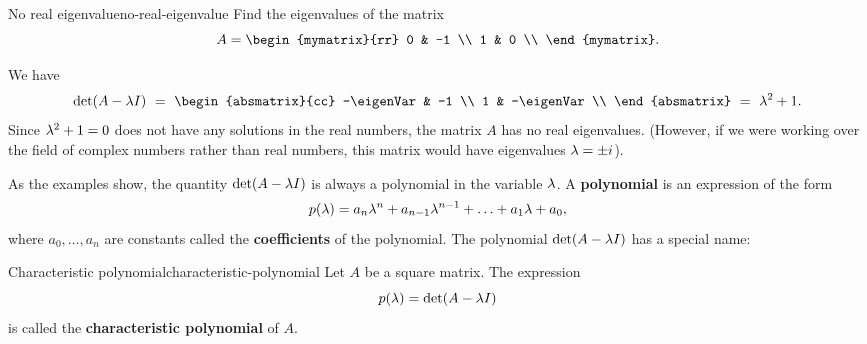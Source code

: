 \begin{example}{No real eigenvalue}{no-real-eigenvalue}
  Find the eigenvalues of the matrix
  \begin{equation*}
    A=\begin{mymatrix}{rr}
      0 & -1 \\
      1 &  0 \\
    \end{mymatrix}.
  \end{equation*}
\end{example}

\begin{solution}
  We have
  \begin{equation*}
    \det(A-\eigenVar I)
    ~=~
        \begin{absmatrix}{cc}
          -\eigenVar & -1 \\
          1 & -\eigenVar \\
        \end{absmatrix} \\
    ~=~
        \eigenVar^2 + 1.
  \end{equation*}
  Since $\lambda^2+1 = 0$ does not have any solutions in the real
  numbers, the matrix $A$ has no real eigenvalues. (However, if we
  were working over the field of complex numbers rather than real
  numbers, this matrix would have eigenvalues $\lambda=\pm i$).
\end{solution}

As the examples show, the quantity $\det(A-\lambda I)$ is always a
polynomial in the variable $\lambda$. A \textbf{polynomial}%
 is an expression of the form
\begin{equation*}
  p(\lambda) = a_n\lambda^n + a_{n-1}\lambda^{n-1} + \ldots + a_1\lambda + a_0,
\end{equation*}
where $a_0,\ldots,a_n$ are constants called the \textbf{coefficients}
of the polynomial. The polynomial $\det(A-\lambda I)$ has a special
name:

\begin{definition}{Characteristic polynomial}{characteristic-polynomial}
  Let $A$ be a square matrix. The expression
  \begin{equation*}
    p(\lambda) = \det(A-\lambda I)
  \end{equation*}
  is called the \textbf{characteristic polynomial}%
   of $A$.
\end{definition}

